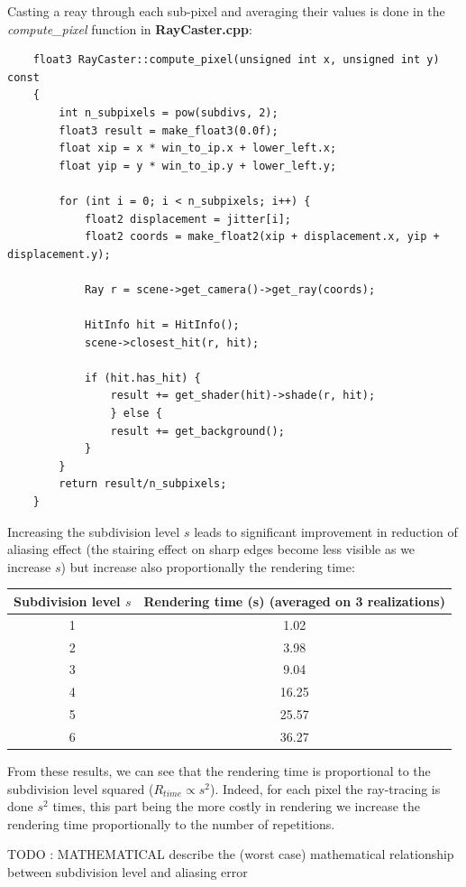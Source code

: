 \documentclass[a4,12pt]{article}
\begin{document}
	Casting a reay through each sub-pixel and averaging their values is done in the \textit{compute\_pixel} function in \textbf{RayCaster.cpp}:
	
	\begin{lstlisting}
	float3 RayCaster::compute_pixel(unsigned int x, unsigned int y) const
	{
		int n_subpixels = pow(subdivs, 2);
		float3 result = make_float3(0.0f);
		float xip = x * win_to_ip.x + lower_left.x;
		float yip = y * win_to_ip.y + lower_left.y;
		
		for (int i = 0; i < n_subpixels; i++) {
			float2 displacement = jitter[i];
			float2 coords = make_float2(xip + displacement.x, yip + displacement.y);
			
			Ray r = scene->get_camera()->get_ray(coords);
			
			HitInfo hit = HitInfo();
			scene->closest_hit(r, hit);
			
			if (hit.has_hit) {
				result += get_shader(hit)->shade(r, hit);
				} else {
				result += get_background();
			}
		}
		return result/n_subpixels;
	}
	\end{lstlisting}
	
	Increasing the subdivision level $s$ leads to significant improvement in reduction of aliasing effect (the stairing effect on sharp edges become less visible as we increase $s$) but increase also proportionally the rendering time:
	
	\begin{center}
	\begin{tabular}{|c|c|}
		\hline
		Subdivision level $s$ & Rendering time (s) (averaged on 3 realizations)\\ \hline
		1 & 1.02\\ \hline
		2 & 3.98\\ \hline
		3 & 9.04\\ \hline
		4 & 16.25\\ \hline
		5 & 25.57\\ \hline
		6 & 36.27\\ \hline
	\end{tabular}
	\end{center}
	
	From these results, we can see that the rendering time is proportional to the subdivision level squared ($R_{time} \propto s^2$). Indeed, for each pixel the ray-tracing is done $s^2$ times, this part being the more costly in rendering we increase the rendering time proportionally to the number of repetitions.
	
	TODO : MATHEMATICAL describe the (worst case) mathematical relationship between subdivision level and aliasing error\\
	
\end{document}

